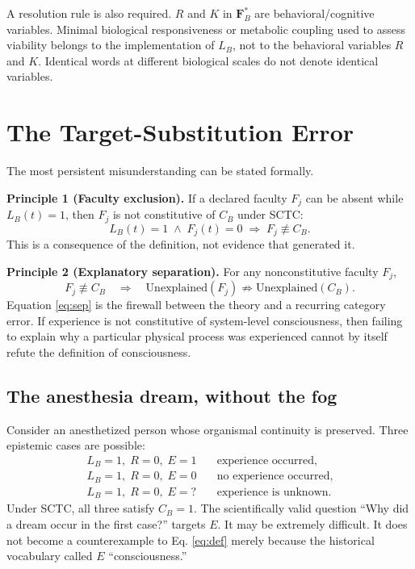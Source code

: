 A resolution rule is also required. $R$ and $K$ in $\mathbf F_B^*$ are behavioral/cognitive variables. Minimal biological responsiveness or metabolic coupling used to assess viability belongs to the implementation of $L_B$, not to the behavioral variables $R$ and $K$. Identical words at different biological scales do not denote identical variables.

\section{The Target-Substitution Error}
The most persistent misunderstanding can be stated formally.

\textbf{Principle 1 (Faculty exclusion).} If a declared faculty $F_j$ can be absent while $L_B(t)=1$, then $F_j$ is not constitutive of $C_B$ under SCTC:
\begin{equation}
L_B(t)=1\;\land\;F_j(t)=0 \;\Rightarrow\; F_j\not\equiv C_B.
\end{equation}
This is a consequence of the definition, not evidence that generated it.

\textbf{Principle 2 (Explanatory separation).} For any nonconstitutive faculty $F_j$,
\begin{equation}
F_j\not\equiv C_B
\quad\Rightarrow\quad
\mathrm{Unexplained}(F_j)\not\Rightarrow\mathrm{Unexplained}(C_B).
\label{eq:sep}
\end{equation}
Equation \ref{eq:sep} is the firewall between the theory and a recurring category error. If experience is not constitutive of system-level consciousness, then failing to explain why a particular physical process was experienced cannot by itself refute the definition of consciousness.

\subsection{The anesthesia dream, without the fog}
Consider an anesthetized person whose organismal continuity is preserved. Three epistemic cases are possible:
\begin{align}
L_B=1,\;R=0,\;E=1 &\quad \text{experience occurred},\\
L_B=1,\;R=0,\;E=0 &\quad \text{no experience occurred},\\
L_B=1,\;R=0,\;E=? &\quad \text{experience is unknown}.
\end{align}
Under SCTC, all three satisfy $C_B=1$. The scientifically valid question ``Why did a dream occur in the first case?'' targets $E$. It may be extremely difficult. It does not become a counterexample to Eq. \ref{eq:def} merely because the historical vocabulary called $E$ ``consciousness.''

